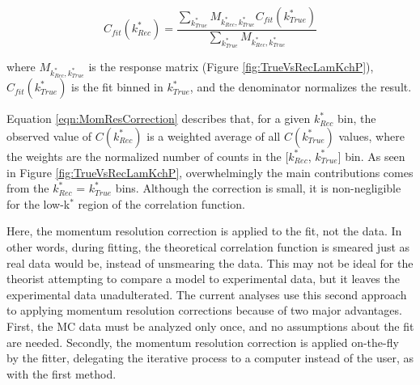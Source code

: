 \documentclass[../AnalysisNoteJBuxton.tex]{subfiles}
\begin{document}
\begin{equation}
  C_{fit}(k^{*}_{Rec}) = \dfrac{\sum\limits_{k^{*}_{True}}M_{k^{*}_{Rec},k^{*}_{True}}C_{fit}(k^{*}_{True})}{\sum\limits_{k^{*}_{True}}M_{k^{*}_{Rec},k^{*}_{True}}}
\label{eqn:MomResCorrection}
\end{equation}

where $M_{k^{*}_{Rec},k^{*}_{True}}$ is the response matrix (Figure \ref{fig:TrueVsRecLamKchP}), $C_{fit}(k^{*}_{True})$ is the fit binned in $k^{*}_{True}$, and the denominator normalizes the result.

Equation \ref{eqn:MomResCorrection} describes that, for a given $k^{*}_{Rec}$ bin, the observed value of $C(k^{*}_{Rec})$ is a weighted average of all $C(k^{*}_{True})$ values, where the weights are the normalized number of counts in the [$k^{*}_{Rec}$, $k^{*}_{True}$] bin.
As seen in Figure \ref{fig:TrueVsRecLamKchP}, overwhelmingly the main contributions comes from the $k^{*}_{Rec}$ = $k^{*}_{True}$ bins.
Although the correction is small, it is non-negligible for the low-k$^{*}$ region of the correlation function.

Here, the momentum resolution correction is applied to the fit, not the data.
In other words, during fitting, the theoretical correlation function is smeared just as real data would be, instead of unsmearing the data.
This may not be ideal for the theorist attempting to compare a model to experimental data, but it leaves the experimental data unadulterated.
The current analyses use this second approach to applying momentum resolution corrections because of two major advantages.  First, the MC data must be analyzed only once, and no assumptions about the fit are needed.  Secondly, the momentum resolution correction is applied on-the-fly by the fitter, delegating the iterative process to a computer instead of the user, as with the first method.
\end{document}
